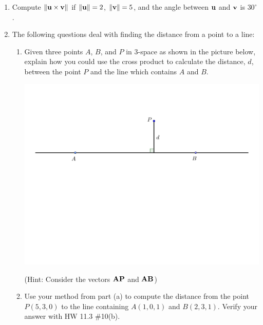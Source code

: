 \documentclass[12pt]{article}
\newif\ifans
\begin{document}
\begin{enumerate}
\item Compute $\|{\bf u} \times {\bf v}\|$ if $\|{\bf u}\|=2$, $\|{\bf v}\|=5$, and the angle between ${\bf u}$ and ${\bf v}$ is $30^{\circ}$.

\ifans{\fbox{5}} \fi

\item The following questions deal with finding the distance from a point to a line:

\begin{enumerate}

\item Given three points $A$, $B$, and $P$ in 3-space as shown in the picture below, explain how you could use the cross product to calculate the distance, $d$, between the point $P$ and the line which contains $A$ and $B$.  

\begin{center}
\includegraphics[scale=0.5]{length.pdf}
\end{center}

(Hint: Consider the vectors ${\bf AP}$ and ${\bf AB}$)

\ifans{\fbox{\parbox{1\linewidth}{Let $\theta$ be the angle between ${\bf AP}$ and ${\bf AB}$.  Then:
\begin{align*}
d&=\|{\bf AP}\|\sin{\theta}\\
&=\frac{\|{\bf AP}\|\|{\bf AB}\|\sin{\theta}}{\|{\bf AB}\|}\\
&=\frac{\|{\bf AP}\times{\bf AB}\|}{\|{\bf AB}\|}
\end{align*}
}}} \fi

\item Use your method from part (a) to compute the distance from the point $P(5,3,0)$ to the line containing $A(1,0,1)$ and $B(2,3,1)$.  Verify your answer with HW 11.3 \#10(b).


\end{enumerate}
\end{enumerate}
\end{document}
